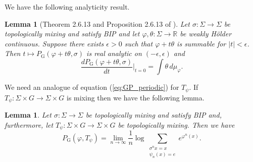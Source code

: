 \documentclass[11pt,letterpaper]{amsart}
\newtheorem{lemma}[theorem]{Lemma}
\theoremstyle{definition}
\numberwithin{equation}{section}
\numberwithin{theorem}{section}
\def\R{\mathbb{R}}
\def\vp{\varphi}
\def\R{\mathbb R}
\def\PG{P_{\mathrm{G}}}
\begin{document}
We have the following analyticity result.

\begin{lemma}[Theorem 2.6.13 and Proposition 2.6.13 of \cite{MU2003}]\label{lem:diff_of_GP}
Let $\sigma : \Sigma \to \Sigma$ be topologically mixing and satisfy BIP and let $\vp,\theta : \Sigma \to \R$ be weakly H\"older continuous. Suppose there exists $\epsilon>0$ such
that $\vp+t\theta$ is summable for $|t|<\epsilon$. Then $t \mapsto \PG(\vp+t\theta,\sigma)$ is real analytic on $(-\epsilon,\epsilon)$ and 
\[
\frac{d\PG(\vp+t\theta,\sigma)}{dt}
\Bigg|_{t=0}
=\int \theta\, d\mu_\vp.
\]
\end{lemma}



We need an analogue of equation (\ref{eq:GP_periodic}) for $T_\psi$.
If 
$T_\psi : \Sigma \times G \to \Sigma \times G$ is mixing then
we have the following lemma.


\begin{lemma}\label{lem:GP_BIP_sp}
Let $\sigma : \Sigma \to \Sigma$ be topologically mixing and satisfy BIP and, furthermore,
let $T_\psi : \Sigma \times G \to \Sigma \times G$ be topologically mixing.
Then we have
\[
\PG(\vp,T_\psi) = \lim_{n \to \infty} \frac{1}{n} \log \sum_{\substack{\sigma^nx=x \\\psi_n(x)=e}} e^{\vp^n(x)}.
\]
\end{lemma}
\end{document}
